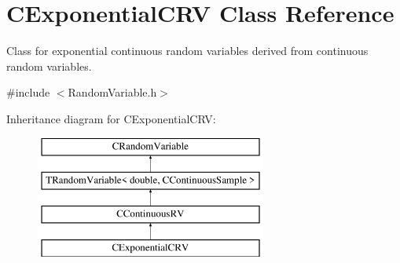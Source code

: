 \hypertarget{class_c_exponential_c_r_v}{\section{C\-Exponential\-C\-R\-V Class Reference}
\label{class_c_exponential_c_r_v}
}


Class for exponential continuous random variables derived from continuous random variables.  




{\ttfamily \#include $<$Random\-Variable.\-h$>$}

Inheritance diagram for C\-Exponential\-C\-R\-V\-:\begin{figure}[H]
\begin{center}
\leavevmode
\includegraphics[height=4.000000cm]{class_c_exponential_c_r_v}
\end{center}
\end{figure}

